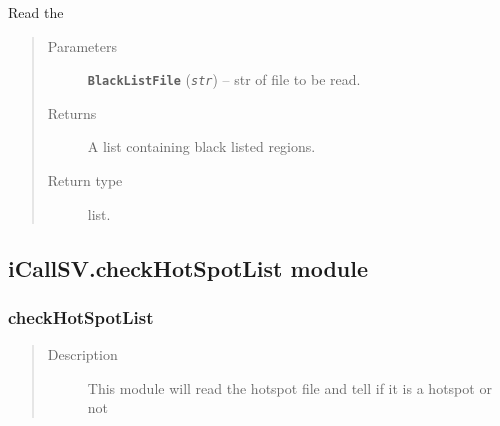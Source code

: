 \documentclass[letterpaper,10pt,english]{sphinxmanual}
\begin{document}
\begin{fulllineitems}
\label{iCallSV:iCallSV.checkBlackList.ReadBlackListFile}
Read the 
\begin{quote}\begin{description}
\item[{Parameters}] \leavevmode
\textbf{\texttt{BlackListFile}} (\emph{\texttt{str}}) -- str of file to be read.

\item[{Returns}] \leavevmode
A list containing black listed regions.

\item[{Return type}] \leavevmode
list.

\end{description}\end{quote}

\end{fulllineitems}



\subsection{iCallSV.checkHotSpotList module}
\label{iCallSV:icallsv-checkhotspotlist-module}\label{iCallSV:module-iCallSV.checkHotSpotList}

\subsubsection{checkHotSpotList}
\label{iCallSV:checkhotspotlist}\begin{quote}\begin{description}
\item[{Description}] \leavevmode
This module will read the hotspot file and tell if it is a hotspot or not

\end{description}\end{quote}
\end{document}
